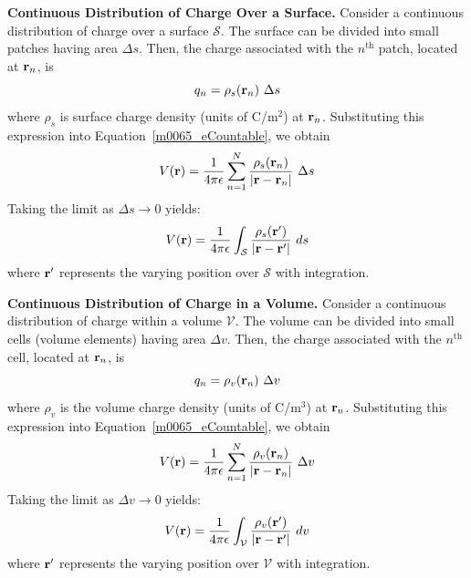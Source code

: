 
{\bf Continuous Distribution of Charge Over a Surface.}
Consider a continuous distribution of charge over a surface $\mathcal{S}$.
The surface can be divided into small patches having area $\Delta s$.  
Then, the charge associated with the $n^{\mbox{th}}$ patch, located at ${\bf r}_n$, is
%
\begin{equation}
q_n = \rho_s({\bf r}_n)~\Delta s
\end{equation}
%
where $\rho_s$ is surface charge density (units of C/m$^2$) at ${\bf r}_n$.
Substituting this expression into Equation~\ref{m0065_eCountable}, we obtain
%
\begin{equation}
V({\bf r}) = \frac{1}{4\pi\epsilon} \sum_{n=1}^{N} { \frac{\rho_s({\bf r}_n)}{\left|{\bf r}-{\bf r}_n\right|}~\Delta s}
\end{equation}
%
Taking the limit as $\Delta s\to 0$ yields:
%
\begin{equation}
V({\bf r}) = \frac{1}{4\pi\epsilon} \int_{\mathcal S} { \frac{\rho_s({\bf r}')}{\left|{\bf r}-{\bf r}'\right|}~ds}
\label{m0065_eSurfCharge}
\end{equation}
%
where ${\bf r}'$ represents the varying position over ${\mathcal S}$ with integration.


{\bf Continuous Distribution of Charge in a Volume.}
Consider a continuous distribution of charge within a volume $\mathcal{V}$.
The volume can be divided into small cells (volume elements) having area $\Delta v$.  
Then, the charge associated with the $n^{\mbox{th}}$ cell, located at ${\bf r}_n$, is
%
\begin{equation}
q_n = \rho_v({\bf r}_n)~\Delta v
\end{equation}
%
where $\rho_v$ is the volume charge density (units of C/m$^3$) at ${\bf r}_n$.
Substituting this expression into Equation~\ref{m0065_eCountable}, we obtain
%
\begin{equation}
V({\bf r}) = \frac{1}{4\pi\epsilon} \sum_{n=1}^{N} {   \frac{\rho_v({\bf r}_n)}{\left|{\bf r}-{\bf r}_n\right|}~\Delta v}
\end{equation}
%
Taking the limit as $\Delta v\to 0$ yields:
%
\begin{equation}
V({\bf r}) = \frac{1}{4\pi\epsilon} \int_{\mathcal V} {   \frac{\rho_v({\bf r}')}{\left|{\bf r}-{\bf r}'\right|}~dv}
\end{equation}
%
where ${\bf r}'$ represents the varying position over ${\mathcal V}$ with integration.


